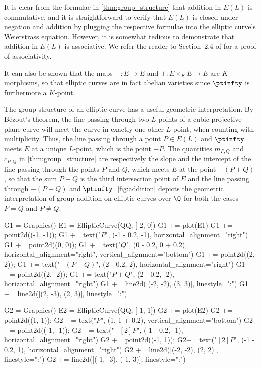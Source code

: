 It is clear from the formulae in \cref{thm:group_structure} that addition in $E(L)$ is commutative, and it is straightforward to verify that $E(L)$ is closed under negation and addition by plugging the respective formulae into the elliptic curve's Weierstrass equation. However, it is somewhat tedious to demonstrate that addition in $E(L)$ is associative. We refer the reader to Section~2.4 of \citep{Washington} for a proof of associativity.

It can also be shown that the maps $- : E \to E$ and $+ : E \times_K E \to E$ are $K$-morphisms, so that elliptic curves are in fact abelian varieties since $\ptinfty$ is furthermore a $K$-point.

The group structure of an elliptic curve has a useful geometric interpretation. By B\'{e}zout's theorem, the line passing through two $L$-points of a cubic projective plane curve will meet the curve in exactly one other $L$-point, when counting with multiplicity. Thus, the line passing through a point $P \in E(L)$ and $\ptinfty$ meets $E$ at a unique $L$-point, which is the point $-P$. The quantities $m_{P,Q}$ and $c_{P,Q}$ in \cref{thm:group_structure} are respectively the slope and the intercept of the line passing through the points $P$ and $Q$, which meets $E$ at the point $-(P + Q)$, so that the sum $P + Q$ is the third intersection point of $E$ and the line passing through $-(P + Q)$ and $\ptinfty$. \cref{fig:addition} depicts the geometric interpretation of group addition on elliptic curves over $\Q$ for both the cases $P = Q$ and $P \neq Q$.

\begin{sagesilent}
G1 = Graphics()
E1 = EllipticCurve(QQ, [-2, 0])
G1 += plot(E1)
G1 += point2d((-1, -1)); G1 += text("$P$", (-1 - 0.2, -1), horizontal_alignment="right")
G1 += point2d((0, 0)); G1 += text("$Q$", (0 - 0.2, 0 + 0.2), horizontal_alignment="right", vertical_alignment="bottom")
G1 += point2d((2, 2)); G1 += text("$-(P + Q)$", (2 - 0.2, 2), horizontal_alignment="right")
G1 += point2d((2, -2)); G1 += text("$P + Q$", (2 - 0.2, -2), horizontal_alignment="right")
G1 += line2d([(-2, -2), (3, 3)], linestyle=":")
G1 += line2d([(2, -3), (2, 3)], linestyle=":")

G2 = Graphics()
E2 = EllipticCurve(QQ, [-1, 1])
G2 += plot(E2)
G2 += point2d((1, 1)); G2 += text("$P$", (1, 1 + 0.2), vertical_alignment="bottom")
G2 += point2d((-1, -1)); G2 += text("$-[2]P$", (-1 - 0.2, -1), horizontal_alignment="right")
G2 += point2d((-1, 1)); G2+= text("$[2]P$", (-1 - 0.2, 1), horizontal_alignment="right")
G2 += line2d([(-2, -2), (2, 2)], linestyle=":")
G2 += line2d([(-1, -3), (-1, 3)], linestyle=":")
\end{sagesilent}

